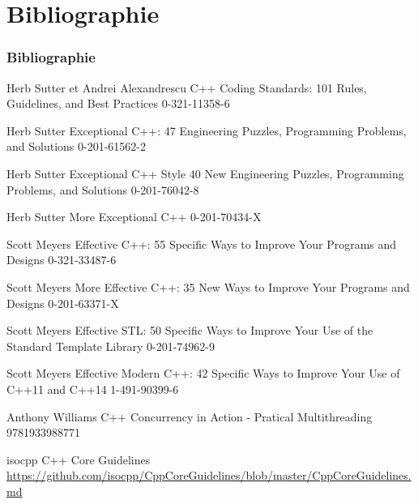 \documentclass[C++.tex]{subfiles}
\begin{document}
\section*{Bibliographie}
\begin{frame}[allowframebreaks]
	\frametitle{Bibliographie}
	\begin{thebibliography}{1}
		Herb Sutter et Andrei Alexandrescu
		\newblock C++ Coding Standards: 101 Rules, Guidelines, and Best Practices
		 0-321-11358-6

		Herb Sutter
		\newblock Exceptional C++: 47 Engineering Puzzles, Programming Problems, and Solutions
		 0-201-61562-2

		Herb Sutter
		\newblock Exceptional C++ Style 40 New Engineering Puzzles, Programming Problems, and Solutions
		 0-201-76042-8

		Herb Sutter
		\newblock More Exceptional C++
		 0-201-70434-X

		Scott Meyers
		\newblock Effective C++: 55 Specific Ways to Improve Your Programs and Designs
		 0-321-33487-6

		Scott Meyers
		\newblock More Effective C++: 35 New Ways to Improve Your Programs and Designs
		 0-201-63371-X

		Scott Meyers
		\newblock Effective STL: 50 Specific Ways to Improve Your Use of the Standard Template Library
		 0-201-74962-9

		Scott Meyers
		\newblock Effective Modern C++: 42 Specific Ways to Improve Your Use of C++11 and C++14
		 1-491-90399-6

		Anthony Williams
		\newblock C++ Concurrency in Action - Pratical Multithreading
		 9781933988771

		isocpp
		\newblock C++ Core Guidelines
		\newblock \url{https://github.com/isocpp/CppCoreGuidelines/blob/master/CppCoreGuidelines.md}


\end{thebibliography}
\end{frame}
\end{document}
